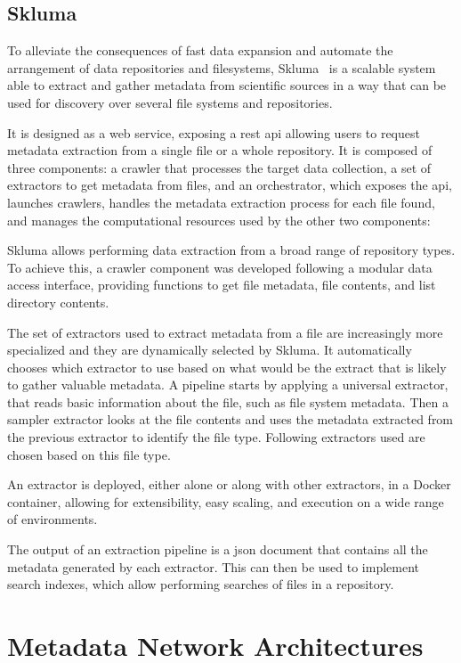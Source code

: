 \subsection*{Skluma}
To alleviate the consequences of fast data expansion and automate the arrangement of data repositories and filesystems, Skluma~\cite{skluma} is a scalable system able to extract and gather metadata from scientific sources in a way that can be used for discovery over several file systems and repositories.

It is designed as a web service, exposing a \gls{rest} \gls{api} allowing users to request metadata extraction from a single file or a whole repository.
It is composed of three components: a crawler that processes the target data collection, a set of extractors to get metadata from files, and an orchestrator, which exposes the \gls{api}, launches crawlers, handles the metadata extraction process for each file found, and manages the computational resources used by the other two components:

Skluma allows performing data extraction from a broad range of repository types.
To achieve this, a crawler component was developed following a modular data access interface, providing functions to get file metadata, file contents, and list directory contents.

The set of extractors used to extract metadata from a file are increasingly more specialized and they are dynamically selected by Skluma.
It automatically chooses which extractor to use based on what would be the extract that is likely to gather valuable metadata.
A pipeline starts by applying a universal extractor, that reads basic information about the file, such as file system metadata.
Then a sampler extractor looks at the file contents and uses the metadata extracted from the previous extractor to identify the file type.
Following extractors used are chosen based on this file type.

An extractor is deployed, either alone or along with other extractors, in a Docker container, allowing for extensibility, easy scaling, and execution on a wide range of environments.

The output of an extraction pipeline is a \gls{json} document that contains all the metadata generated by each extractor.
This can then be used to implement search indexes, which allow performing searches of files in a repository.

\section{Metadata Network Architectures}

